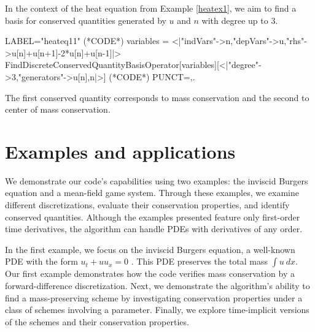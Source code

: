 \documentclass[runningheads]{llncs}
\newcommand{\1}{\chi}
\begin{document}
\begin{example}
In the context of the heat equation from Example \ref{heatex1}, we aim to find a basis for conserved quantities generated by $u$ and $n$ with degree up to 3.
	\begin{EXE}
		LABEL="heateq11"
		(*CODE*)
		variables = <|"indVars"->{n},"depVars"->{u},"rhs"->{u[n]+u[n+1]-2*u[n]+u[n-1]}|>
		FindDiscreteConservedQuantityBasisOperator[variables][<|"degree"->3,"generators"->{u[n],n}|>]
		(*CODE*)
		PUNCT={,.}
	\end{EXE}
	\begin{small}
		
		
	\end{small}
The first conserved quantity corresponds to mass conservation and the second to center of mass conservation. 
\end{example}
\section{Examples and applications}
\label{eaa}
We demonstrate our code's capabilities using two examples: the inviscid Burgers equation and a mean-field game system. 
Through these examples, we examine different discretizations, evaluate their conservation properties, and identify conserved quantities.
Although the examples presented feature only first-order time derivatives, the algorithm can handle PDEs with derivatives of any order.

In the first example, we focus on the inviscid Burgers equation, a well-known PDE with the form $u_t + uu_x = 0$ \cite{smoller94}. 
This PDE preserves the total mass $\int u\ dx$.
Our first example demonstrates how the code verifies mass conservation by a forward-difference discretization.
Next, we demonstrate the algorithm's ability to find a mass-preserving scheme by investigating conservation properties under a class of schemes involving a parameter.
Finally, we explore time-implicit versions of the schemes and their conservation properties.
\end{document}
